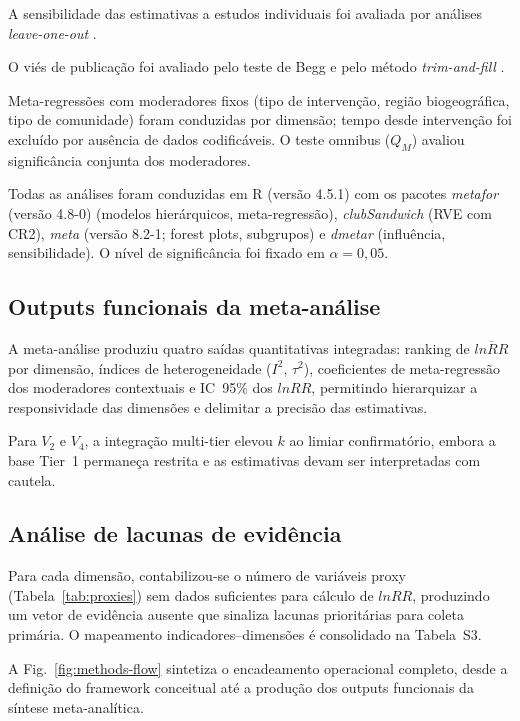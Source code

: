 \documentclass[12pt,a4paper]{article}
\begin{document}
A sensibilidade das estimativas a estudos individuais foi avaliada por análises \textit{leave-one-out} \citep{Viechtbauer2010}.

O viés de publicação foi avaliado pelo teste de Begg \citep{Begg1994} e pelo método \textit{trim-and-fill} \citep{Duval2000}.

Meta-regressões com moderadores fixos (tipo de intervenção, região biogeográfica, tipo de comunidade) foram conduzidas por dimensão; tempo desde intervenção foi excluído por ausência de dados codificáveis. O teste omnibus ($Q_M$) avaliou significância conjunta dos moderadores.

Todas as análises foram conduzidas em R (versão 4.5.1) com os pacotes \textit{metafor} (versão 4.8-0) \citep{Viechtbauer2010} (modelos hierárquicos, meta-regressão), \textit{clubSandwich} \citep{Pustejovsky2022} (RVE com CR2), \textit{meta} (versão 8.2-1; forest plots, subgrupos) e \textit{dmetar} (influência, sensibilidade). O nível de significância foi fixado em $\alpha = 0{,}05$.

\subsection{Outputs funcionais da meta-análise}
\label{sec:outputs}

A meta-análise produziu quatro saídas quantitativas integradas: ranking de $\overline{lnRR}$ por dimensão, índices de heterogeneidade ($I^2$, $\tau^2$), coeficientes de meta-regressão dos moderadores contextuais e IC~95\% dos $lnRR$, permitindo hierarquizar a responsividade das dimensões e delimitar a precisão das estimativas.

Para $V_2$ e $V_4$, a integração multi-tier elevou $k$ ao limiar confirmatório, embora a base Tier~1 permaneça restrita e as estimativas devam ser interpretadas com cautela.

\subsection{Análise de lacunas de evidência}
\label{sec:gaps}

Para cada dimensão, contabilizou-se o número de variáveis proxy (Tabela~\ref{tab:proxies}) sem dados suficientes para cálculo de $lnRR$, produzindo um vetor de evidência ausente que sinaliza lacunas prioritárias para coleta primária. O mapeamento indicadores--dimensões é consolidado na Tabela~S3.

A Fig.~\ref{fig:methods-flow} sintetiza o encadeamento operacional completo, desde a definição do framework conceitual até a produção dos outputs funcionais da síntese meta-analítica.
\end{document}

